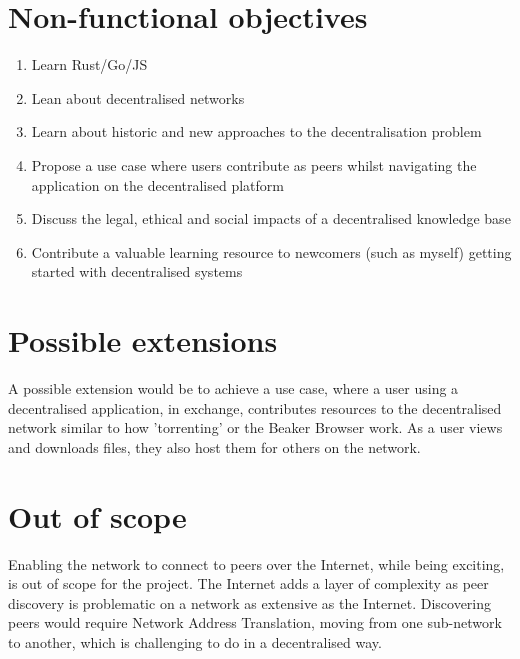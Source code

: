 \section{Non-functional objectives}
\begin{enumerate}
    \item Learn Rust/Go/JS
    \item Lean about decentralised networks
    \item Learn about historic and new approaches to the decentralisation problem
    \item Propose a use case where users contribute as peers whilst navigating the application on the decentralised platform
    \item Discuss the legal, ethical and social impacts of a decentralised knowledge base
    \item Contribute a valuable learning resource to newcomers (such as myself) getting started with decentralised systems
\end{enumerate}

\section{Possible extensions}
A possible extension would be to achieve a use case, where a user using a decentralised application, in exchange, contributes resources to the decentralised network similar to how 'torrenting' or the Beaker Browser work. As a user views and downloads files, they also host them for others on the network.

\section{Out of scope}
Enabling the network to connect to peers over the Internet, while being exciting, is out of scope for the project. The Internet adds a layer of complexity as peer discovery is problematic on a network as extensive as the Internet. Discovering peers would require Network Address Translation, moving from one sub-network to another, which is challenging to do in a decentralised way.